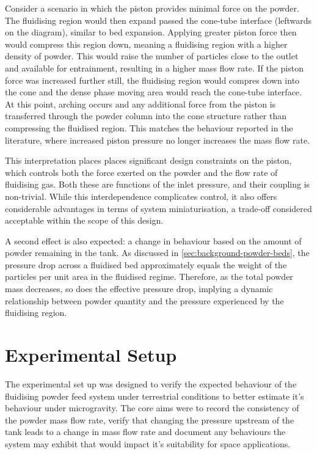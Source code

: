 Consider a scenario in which the piston provides minimal force on the powder. The fluidising region would then expand passed the cone-tube interface (leftwards on the diagram), similar to bed expansion. Applying greater piston force then would compress this region down, meaning a fluidising region with a higher density of powder. This would raise the number of particles close to the outlet and available for entrainment, resulting in a higher mass flow rate. If the piston force was increased further still, the fluidising region would compres down into the cone and the dense phase moving area would reach the cone-tube interface. At this point, arching occurs and any additional force from the piston is transferred through the powder column into the cone structure rather than compressing the fluidised region. This matches the behaviour reported in the literature, where increased piston pressure no longer increases the mass flow rate. 

This interpretation places places significant design constraints on the piston, which controls both the force exerted on the powder and the flow rate of fluidising gas. Both these are functions of the inlet pressure, and their coupling is non-trivial. While this interdependence complicates control, it also offers considerable advantages in terms of system miniaturisation, a trade-off considered acceptable within the scope of this design.

A second effect is also expected: a change in behaviour based on the amount of powder remaining in the tank. As discussed in \autoref{sec:background-powder-beds}, the pressure drop across a fluidised bed approximately equals the weight of the particles per unit area in the fluidised regime. Therefore, as the total powder mass decreases, so does the effective pressure drop, implying a dynamic relationship between powder quantity and the pressure experienced by the fluidising region.

\section{Experimental Setup}
The experimental set up was designed to verify the expected behaviour of the fluidising powder feed system under terrestrial conditions to better estimate it's behaviour under microgravity. The core aims were to record the consistency of the powder mass flow rate, verify that changing the pressure upstream of the tank leads to a change in mass flow rate and document any behaviours the system may exhibit that would impact it's suitability for space applications.

